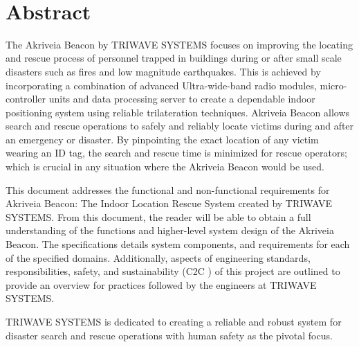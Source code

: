 
\
\section*{Abstract}	%
\medskip
The Akriveia Beacon by TRIWAVE SYSTEMS focuses on improving the locating and rescue process of personnel trapped in buildings during or after small scale disasters such as fires and low magnitude earthquakes. This is achieved by incorporating a combination of advanced Ultra-wide-band radio modules, micro-controller units and data processing server to create a dependable indoor positioning system using reliable trilateration techniques. Akriveia Beacon allows search and rescue operations to safely and reliably locate victims during and after an emergency or disaster. By pinpointing the exact location of any victim wearing an ID tag, the search and rescue time is minimized for rescue operators; which is crucial in any situation where the Akriveia Beacon would be used.

\bigskip
This document addresses the functional and non-functional requirements for Akriveia Beacon: The Indoor Location Rescue System created by TRIWAVE SYSTEMS. From this document, the reader will be able to obtain a full understanding of the functions and higher-level system design of the Akriveia Beacon. The specifications details system components, and requirements for each of the specified domains. Additionally, aspects of engineering standards, responsibilities, safety, and sustainability (C2C \cite{R25}) of this project are outlined to provide an overview for practices followed by the engineers at TRIWAVE SYSTEMS.

\bigskip
TRIWAVE SYSTEMS is dedicated to creating a reliable and robust system for disaster search and rescue operations with human safety as the pivotal focus.

%